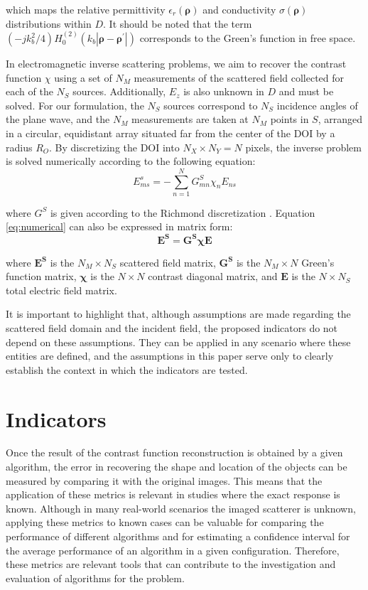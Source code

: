 \documentclass{IEEEtran}
\newcommand{\brho}{\boldsymbol{\rho}}
\newcommand{\brhop}{\boldsymbol{\rho^\prime}}
\newcommand{\Es}{\mathbf{E^S}}
\newcommand{\GS}{\mathbf{G^S}}
\newcommand{\X}{\boldsymbol{\chi}}
\newcommand{\E}{\mathbf{E}}
\begin{document}
		\noindent which maps the relative permittivity $\epsilon_r(\brho)$ and conductivity $\sigma(\brho)$ distributions within $D$. It should be noted that the term $(-jk_b^2/4) H_0^{(2)}(k_b|\brho-\brhop|)$ corresponds to the Green's function in free space.
		
		In electromagnetic inverse scattering problems, we aim to recover the contrast function $\chi$ using a set of $N_M$ measurements of the scattered field collected for each of the $N_S$ sources. Additionally, $E_z$ is also unknown in $D$ and must be solved. For our formulation, the $N_S$ sources correspond to $N_S$ incidence angles of the plane wave, and the $N_M$ measurements are taken at $N_M$ points in $S$, arranged in a circular, equidistant array situated far from the center of the DOI by a radius $R_O$. By discretizing the DOI into $N_X \times N_Y = N$ pixels, the inverse problem is solved numerically according to the following equation:
		\begin{equation}
			E^s_{ms} = - \sum\limits_{n=1}^{N} G^S_{mn}\chi_{n}E_{ns} \label{eq:numerical}
		\end{equation}
		
		\noindent where $G^S$ is given according to the Richmond discretization \cite{richmond1965scattering, pastorino2010ch3}. Equation \eqref{eq:numerical} can also be expressed in matrix form:
		\begin{equation}
			\Es = \GS\X\E
		\end{equation}
		
		\noindent where $\Es$ is the $N_M \times N_S$ scattered field matrix, $\GS$ is the $N_M \times N$ Green's function matrix, $\X$ is the $N \times N$ contrast diagonal matrix, and $\E$ is the $N \times N_S$ total electric field matrix.
		
		It is important to highlight that, although assumptions are made regarding the scattered field domain and the incident field, the proposed indicators do not depend on these assumptions. They can be applied in any scenario where these entities are defined, and the assumptions in this paper serve only to clearly establish the context in which the indicators are tested.
	
	\section{Indicators}\label{sec:indicators}
		
		Once the result of the contrast function reconstruction is obtained by a given algorithm, the error in recovering the shape and location of the objects can be measured by comparing it with the original images. This means that the application of these metrics is relevant in studies where the exact response is known. Although in many real-world scenarios the imaged scatterer is unknown, applying these metrics to known cases can be valuable for comparing the performance of different algorithms and for estimating a confidence interval for the average performance of an algorithm in a given configuration. Therefore, these metrics are relevant tools that can contribute to the investigation and evaluation of algorithms for the problem.
		
\end{document}
